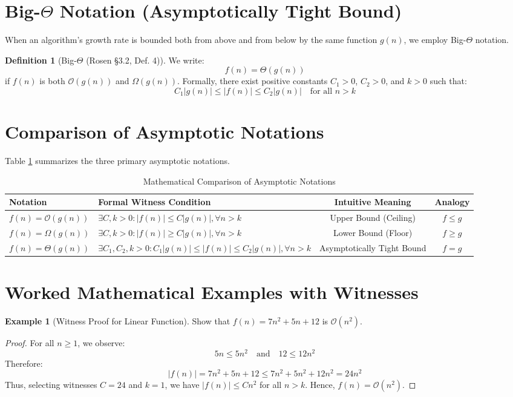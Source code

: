 \documentclass[11pt,a4paper,oneside]{report}
\theoremstyle{definition}
\newtheorem{definition}{Definition}[chapter]
\newtheorem{example}{Example}[chapter]
\begin{document}
\section{Big-$\Theta$ Notation (Asymptotically Tight Bound)}
When an algorithm's growth rate is bounded both from above and from below by the same function $g(n)$, we employ Big-$\Theta$ notation.

\begin{definition}[Big-$\Theta$ (Rosen §3.2, Def. 4)]
We write:
$$f(n) = \Theta(g(n))$$
if $f(n)$ is both $\mathcal{O}(g(n))$ and $\Omega(g(n))$. Formally, there exist positive constants $C_1 > 0$, $C_2 > 0$, and $k > 0$ such that:
$$C_1 |g(n)| \le |f(n)| \le C_2 |g(n)| \quad \text{for all } n > k$$
\end{definition}

\section{Comparison of Asymptotic Notations}
Table \ref{tab:asymptotic_summary} summarizes the three primary asymptotic notations.

\begin{table}[htbp]
\centering
\caption{Mathematical Comparison of Asymptotic Notations}
\label{tab:asymptotic_summary}
\begin{tabularx}{\textwidth}{l X c c}
\toprule
\textbf{Notation} & \textbf{Formal Witness Condition} & \textbf{Intuitive Meaning} & \textbf{Analogy} \\
\midrule
$f(n) = \mathcal{O}(g(n))$ & $\exists C, k > 0 : |f(n)| \le C |g(n)|, \forall n > k$ & Upper Bound (Ceiling) & $f \le g$ \\
$f(n) = \Omega(g(n))$ & $\exists C, k > 0 : |f(n)| \ge C |g(n)|, \forall n > k$ & Lower Bound (Floor) & $f \ge g$ \\
$f(n) = \Theta(g(n))$ & $\exists C_1, C_2, k > 0 : C_1 |g(n)| \le |f(n)| \le C_2 |g(n)|, \forall n > k$ & Asymptotically Tight Bound & $f = g$ \\
\bottomrule
\end{tabularx}
\end{table}

\section{Worked Mathematical Examples with Witnesses}

\begin{example}[Witness Proof for Linear Function]
Show that $f(n) = 7n^2 + 5n + 12$ is $\mathcal{O}(n^2)$.
\begin{proof}
For all $n \ge 1$, we observe:
$$5n \le 5n^2 \quad \text{and} \quad 12 \le 12n^2$$
Therefore:
$$|f(n)| = 7n^2 + 5n + 12 \le 7n^2 + 5n^2 + 12n^2 = 24n^2$$
Thus, selecting witnesses $C = 24$ and $k = 1$, we have $|f(n)| \le C n^2$ for all $n > k$. Hence, $f(n) = \mathcal{O}(n^2)$.
\end{proof}
\end{example}
\end{document}
